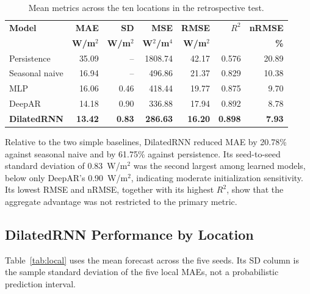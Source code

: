 \documentclass[runningheads]{llncs}
\begin{document}
\begin{table}[t]
\caption{Mean metrics across the ten locations in the retrospective test.}
\label{tab:overall}
\centering
\scriptsize
\setlength{\tabcolsep}{3.2pt}
\begin{tabular}{@{}lrrrrrr@{}}
\toprule
\textbf{Model} & \textbf{MAE} & \textbf{SD} & \textbf{MSE} & \textbf{RMSE} & \textbf{$R^2$} & \textbf{nRMSE} \\
 & \textbf{W/m$^2$} & \textbf{W/m$^2$} & \textbf{W$^2$/m$^4$} & \textbf{W/m$^2$} & & \textbf{\%} \\
\midrule
Persistence    & 35.09 & --   & 1808.74 & 42.17 & 0.576 & 20.89 \\
Seasonal naive & 16.94 & --   & 496.86  & 21.37 & 0.829 & 10.38 \\
MLP            & 16.06 & 0.46 & 418.44  & 19.77 & 0.875 & 9.70 \\
DeepAR         & 14.18 & 0.90 & 336.88  & 17.94 & 0.892 & 8.78 \\
\midrule
\textbf{DilatedRNN} & \textbf{13.42} & \textbf{0.83} & \textbf{286.63} & \textbf{16.20} & \textbf{0.898} & \textbf{7.93} \\
\bottomrule
\end{tabular}
\end{table}

Relative to the two simple baselines, DilatedRNN reduced MAE by 20.78\% against seasonal naive and by 61.75\% against persistence. Its seed-to-seed standard deviation of 0.83~W/m$^2$ was the second largest among learned models, below only DeepAR's 0.90~W/m$^2$, indicating moderate initialization sensitivity. Its lowest RMSE and nRMSE, together with its highest $R^2$, show that the aggregate advantage was not restricted to the primary metric.

\subsection{DilatedRNN Performance by Location}

Table~\ref{tab:local} uses the mean forecast across the five seeds. Its SD column is the sample standard deviation of the five local MAEs, not a probabilistic prediction interval.
\end{document}
